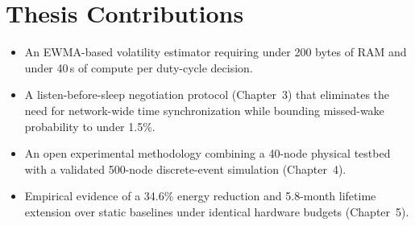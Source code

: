 \section{Thesis Contributions}
\begin{itemize}[leftmargin=1.4em]
  \item An EWMA-based volatility estimator requiring under 200 bytes of RAM and under
        40\,\textmu s of compute per duty-cycle decision.
  \item A listen-before-sleep negotiation protocol (Chapter~3) that eliminates the need for
        network-wide time synchronization while bounding missed-wake probability to
        under 1.5\%.
  \item An open experimental methodology combining a 40-node physical testbed with a
        validated 500-node discrete-event simulation (Chapter~4).
  \item Empirical evidence of a 34.6\% energy reduction and 5.8-month lifetime extension
        over static baselines under identical hardware budgets (Chapter~5).
\end{itemize}
